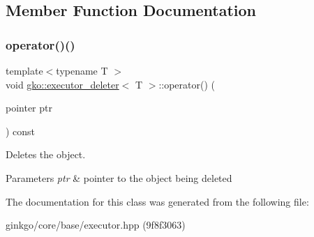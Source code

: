 \subsection{Member Function Documentation}
\mbox{\label{classgko_1_1executor__deleter_aaefa9d9f1c8ae4f4723668d5f946e5c0}} 
\subsubsection{\texorpdfstring{operator()()}{operator()()}}
{\footnotesize\ttfamily template$<$typename T $>$ \\
void \hyperlink{classgko_1_1executor__deleter}{gko\+::executor\+\_\+deleter}$<$ T $>$\+::operator() (\begin{DoxyParamCaption}\item[{pointer}]{ptr }\end{DoxyParamCaption}) const}



Deletes the object. 


\begin{DoxyParams}{Parameters}
{\em ptr} & pointer to the object being deleted \\
\hline
\end{DoxyParams}


The documentation for this class was generated from the following file\+:\begin{DoxyCompactItemize}
\item 
ginkgo/core/base/executor.\+hpp (9f8f3063)\end{DoxyCompactItemize}
